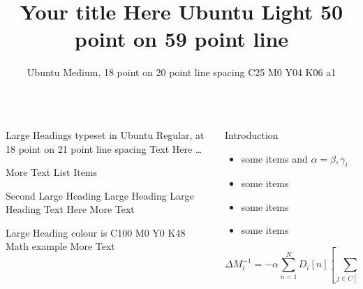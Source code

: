 \documentclass[final,hyperref={pdfpagelabels=false}]{beamer}
\title{Your title Here Ubuntu Light 50 point on 59 point line}
\author{Ubuntu Medium, 18 point on 20 point line spacing C25 M0 Y04 K06 a1}
\begin{document}
\begin{frame}{}
\begin{columns}[T] %
\begin{column}{.43\paperwidth} %

\begin{block}{Large Headings typeset in Ubuntu Regular, at 18 point on 21 point line spacing}
Text Here \dots

More Text \blindtext
{}
List Items \blinditemize
\end{block}

\begin{block}{Second Large Heading Large Heading Large Heading}
Text Here \blinddescription
{}
More Text \blindtext
\end{block}

\begin{block}{Large Heading colour is C100 M0 Y0 K48}
Math example \blindmathtrue
More Text \blindtext
\end{block}


\end{column}
\begin{column}{.43\paperwidth} %


\begin{block}{Introduction}
	\begin{itemize}
		\item some items and $\alpha=\beta,\gamma_{i}$
		\item some items
		\item some items
		\item some items
	\end{itemize}

	$$\Delta M_i^{-1} = - \alpha \sum_{n=1}^N D_i \left[ n \right] \left[ \sum_{j \in C \left[ i \right]}^{} F_{ji} \left[ n-1 \right] + Fext_i \left[ n^{-1} \right] \right]$$
	
\end{block}


\end{column}
\end{columns}
\end{frame}
\end{document}
